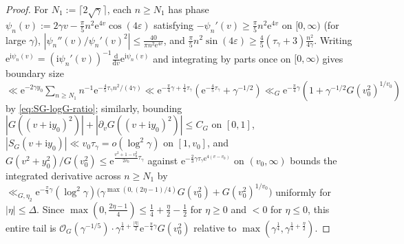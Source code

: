 \documentclass[11pt,a4paper,reqno]{amsart}
\theoremstyle{definition}
\theoremstyle{remark}
\numberwithin{equation}{section}
\newcommand{\dd}{\mathrm{d}}
\newcommand{\ii}{\mathrm{i}}
\newcommand{\ee}{\mathrm{e}}
\begin{document}
\begin{proof}
For $N_1 := \lceil 2\sqrt{\gamma}\rceil$, each $n \ge N_1$ has phase $\psi_n(v) := 2\gamma v - \frac{\pi}{5}n^2\ee^{4v}\cos(4\varepsilon)$ satisfying $-\psi_n'(v) \ge \frac{\pi}{5}n^2\ee^{4v}$ on $[0,\infty)$ (for large $\gamma$), $|\psi_n''(v)/\psi_n'(v)^2| \le \frac{40}{\pi n^2\ee^{4v}}$, and $\frac{\pi}{5}n^2\sin(4\varepsilon) \ge \frac{4}{5}(\tau_\gamma + 3)\frac{n^2}{4\gamma}$. Writing $\ee^{\ii\psi_n(v)} = (\ii\psi_n'(v))^{-1}\frac{\dd}{\dd v}\ee^{\ii\psi_n(v)}$ and integrating by parts once on $[0,\infty)$ gives boundary size $\ll \ee^{-2\gamma y_0}\sum_{n \ge N_1} n^{-1}\ee^{-\frac{4}{5}\tau_\gamma n^2/(4\gamma)} \ll \ee^{-\frac{\pi}{4}\gamma + \frac{1}{4}\tau_\gamma}(\ee^{-\frac{4}{5}\tau_\gamma} + \gamma^{-1/2}) \ll_G \ee^{-\frac{\pi}{4}\gamma}(1 + \gamma^{-1/2}G(v_0^2)^{1/v_0})$ by \eqref{eq:SG-logG-ratio}; similarly, bounding $|G((v+\ii y_0)^2)| + |\partial_v G((v+\ii y_0)^2)| \le C_G$ on $[0,1]$, $|S_G(v+\ii y_0)| \ll v_0\tau_\gamma = o(\log^2\gamma)$ on $[1,v_0]$, and $G(v^2 + y_0^2)/G(v_0^2) \le \ee^{\frac{v^2+1-v_0^2}{2v_0}\tau_\gamma}$ against $\ee^{-\frac{2}{3}\gamma\tau_\gamma\ee^{4(v-v_0)}}$ on $(v_0,\infty)$ bounds the integrated derivative across $n \ge N_1$ by $\ll_{G,\eta_2} \ee^{-\frac{\pi}{4}\gamma}(\log^2\gamma)\bigl(\gamma^{\max(0, (2\eta - 1)/4)}G(v_0^2) + G(v_0^2)^{1/v_0}\bigr)$ uniformly for $|\eta| \le \Delta$. Since $\max(0, \frac{2\eta - 1}{4}) \le \frac{1}{4} + \frac{\eta}{2} - \frac{1}{2}$ for $\eta \ge 0$ and $< 0$ for $\eta \le 0$, this entire tail is $\mathcal{O}_G(\gamma^{-1/5})\cdot \gamma^{\frac{1}{4}+\frac{|\eta|}{2}}\ee^{-\frac{\pi}{4}\gamma}G(v_0^2)$ relative to $\max(\gamma^{\frac{1}{4}}, \gamma^{\frac{1}{4}+\frac{\eta}{2}})$.


\end{proof}
\end{document}
